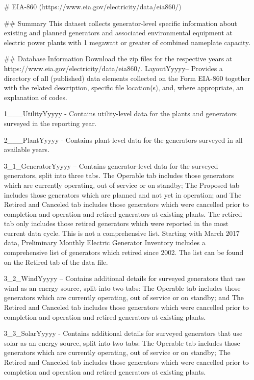 # EIA-860 (https://www.eia.gov/electricity/data/eia860/)

## Summary
This dataset collects generator-level specific information about existing and planned generators and associated environmental equipment at electric power plants with 1 megawatt or greater of combined nameplate capacity.

## Database Information
Download the zip files for the respective years at https://www.eia.gov/electricity/data/eia860/. 
LayoutYyyyy– Provides a directory of all (published) data elements collected on the Form EIA-860 together with the related description, specific file location(s), and, where appropriate, an explanation of codes.

1___UtilityYyyyy - Contains utility-level data for the plants and generators surveyed in the reporting year.

2___PlantYyyyy - Contains plant-level data for the generators surveyed in all available years.

3_1_GeneratorYyyyy – Contains generator-level data for the surveyed generators, split into three tabs.
The Operable tab includes those generators which are currently operating, out of service or on standby;
The Proposed tab includes those generators which are planned and not yet in operation; and
The Retired and Canceled tab includes those generators which were cancelled prior to completion and operation and retired generators at existing plants.
The retired tab only includes those retired generators which were reported in the most current data cycle. This is not a comprehensive list. Starting with March 2017 data, Preliminary Monthly Electric Generator Inventory includes a comprehensive list of generators which retired since 2002. The list can be found on the Retired tab of the data file.

3_2_WindYyyyy – Contains additional details for surveyed generators that use wind as an energy source, split into two tabs:
The Operable tab includes those generators which are currently operating, out of service or on standby; and
The Retired and Canceled tab includes those generators which were cancelled prior to completion and operation and retired generators at existing plants.

3_3_SolarYyyyy - Contains additional details for surveyed generators that use solar as an energy source, split into two tabs:
The Operable tab includes those generators which are currently operating, out of service or on standby;
The Retired and Canceled tab includes those generators which were cancelled prior to completion and operation and retired generators at existing plants.

